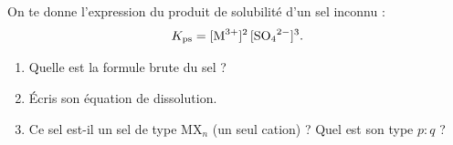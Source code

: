 \documentclass[11pt,a4paper]{article}
\begin{document}
\begin{exo}
On te donne l'expression du produit de solubilité d'un sel inconnu :
\[ K_{\mathrm{ps}} = [\ce{M^{3+}}]^{2}\,[\ce{SO4^{2-}}]^{3}. \]
\begin{enumerate}[label=\alph*)]
  \item Quelle est la formule brute du sel ?
  \item Écris son équation de dissolution.
  \item Ce sel est-il un sel de type $\mathrm{MX}_n$ (un seul cation) ? Quel est son type $p{:}q$ ?
\end{enumerate}
\end{exo}
\end{document}
